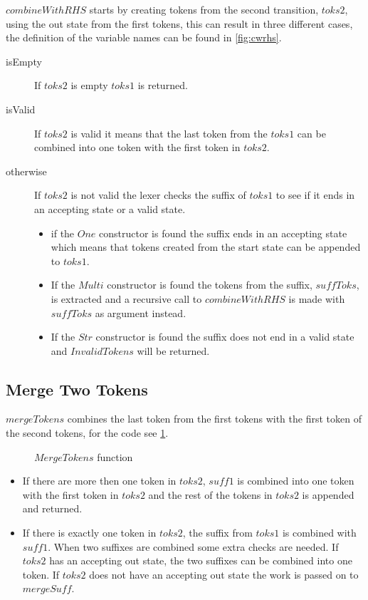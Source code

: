 $combineWithRHS$ starts by creating tokens from the second transition, $toks2$,
using the out state from the first tokens, this can result in three different
cases, the definition of the variable names can be found in \cref{fig:cwrhs}.
\begin{description}
\item[isEmpty]If $toks2$ is empty $toks1$ is returned.
\item[isValid]If $toks2$ is valid it means that the last token from the
  $toks1$ can be combined into one token with the first token in $toks2$.
\item[otherwise]If $toks2$ is not valid the lexer checks the suffix of $toks1$
  to see if it ends in an accepting state or a valid state.
  \begin{itemize}
  \item if the $One$ constructor is found the suffix ends in an accepting state
    which means that tokens created from the start state can be appended to
    $toks1$.
  \item If the $Multi$ constructor is found the tokens from the suffix,
    $suffToks$, is extracted and a recursive call to $combineWithRHS$ is made
    with $suffToks$ as argument instead.
  \item If the $Str$ constructor is found the suffix does not end in a valid
    state and $InvalidTokens$ will be returned.
  \end{itemize}
\end{description}

\subsection{Merge Two Tokens}
$mergeTokens$ combines the last token from the first tokens with
the first token of the second tokens, for the code see \cref{fig:mergetokens}.

\begin{figure}[h!]
  
  \caption{$MergeTokens$ function \label{fig:mergetokens}}
\end{figure}
\begin{itemize}
\item If there are more then one token in $toks2$, $suff1$ is combined into one
  token with the first token in $toks2$ and the rest of the tokens in $toks2$
  is appended and returned.
\item If there is exactly one token in $toks2$, the suffix from $toks1$ is
  combined with $suff1$. When two suffixes are combined some extra checks are
  needed. If $toks2$ has an accepting out state, the two suffixes
  can be combined into one token. If $toks2$ does not have an accepting out
  state the work is passed on to $mergeSuff$.
\end{itemize}

